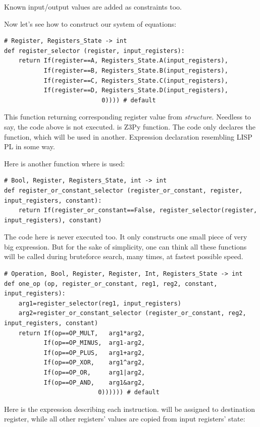 Known input/output values are added as constraints too.

Now let's see how to construct our system of equations:

\begin{lstlisting}
# Register, Registers_State -> int
def register_selector (register, input_registers):
    return If(register==A, Registers_State.A(input_registers),
           If(register==B, Registers_State.B(input_registers), 
           If(register==C, Registers_State.C(input_registers), 
           If(register==D, Registers_State.D(input_registers), 
                           0)))) # default
\end{lstlisting}

This function returning corresponding register value from \textit{structure}.
Needless to say, the code above is not executed. 
 is Z3Py function. 
The code only declares the function, which will be used in another. 
Expression declaration resembling LISP \ac{PL} in some way.

Here is another function where  is used:

\begin{lstlisting}
# Bool, Register, Registers_State, int -> int
def register_or_constant_selector (register_or_constant, register, input_registers, constant): 
    return If(register_or_constant==False, register_selector(register, input_registers), constant)
\end{lstlisting}

The code here is never executed too. 
It only constructs one small piece of very big expression. 
But for the sake of simplicity, one can think all these functions will be called during bruteforce search, many times,
at fastest possible speed.

\begin{lstlisting}
# Operation, Bool, Register, Register, Int, Registers_State -> int
def one_op (op, register_or_constant, reg1, reg2, constant, input_registers):
    arg1=register_selector(reg1, input_registers)
    arg2=register_or_constant_selector (register_or_constant, reg2, input_registers, constant)
    return If(op==OP_MULT,   arg1*arg2,
           If(op==OP_MINUS,  arg1-arg2,
           If(op==OP_PLUS,   arg1+arg2, 
           If(op==OP_XOR,    arg1^arg2, 
           If(op==OP_OR,     arg1|arg2, 
           If(op==OP_AND,    arg1&arg2, 
                          0)))))) # default
\end{lstlisting}

Here is the expression describing each instruction. 
 will be assigned to destination register,
while all other registers' values are copied from input registers' state:

